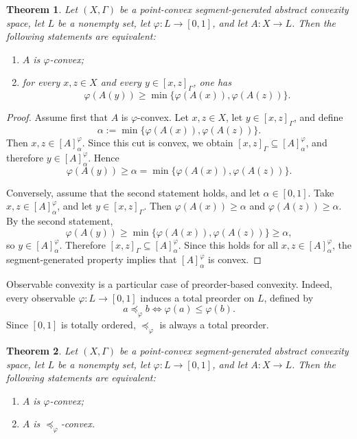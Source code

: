 \documentclass[11pt,a4paper]{article}
\newtheorem{theorem}{Theorem}
\begin{document}
\begin{theorem}\label{teo_obs_local}
Let \((X,\Gamma)\) be a point-convex segment-generated abstract convexity space, let \(L\) be a nonempty set, let \(\varphi:L\to[0,1]\), and let \(A:X\to L\). Then the following statements are equivalent:
\begin{enumerate}
    \item \(A\) is \(\varphi\)-convex;
    \item for every \(x,z\in X\) and every \(y\in[x,z]_{\Gamma}\), one has
    \[
    \varphi(A(y))\ge \min\{\varphi(A(x)),\varphi(A(z))\}.
    \]
\end{enumerate}
\end{theorem}

\begin{proof}
Assume first that \(A\) is \(\varphi\)-convex. Let \(x,z\in X\), let \(y\in[x,z]_{\Gamma}\), and define
\[
\alpha:=\min\{\varphi(A(x)),\varphi(A(z))\}.
\]
Then \(x,z\in[A]^\varphi_\alpha\). Since this cut is convex, we obtain \([x,z]_{\Gamma}\subseteq[A]^\varphi_\alpha\), and therefore \(y\in[A]^\varphi_\alpha\). Hence
\[
\varphi(A(y))\ge \alpha=\min\{\varphi(A(x)),\varphi(A(z))\}.
\]



Conversely, assume that the second statement holds, and let \(\alpha\in[0,1]\). Take \(x,z\in[A]^\varphi_\alpha\), and let \(y\in[x,z]_{\Gamma}\). Then \(\varphi(A(x))\ge\alpha\) and \(\varphi(A(z))\ge\alpha\). By the second statement,
\[
\varphi(A(y))\ge \min\{\varphi(A(x)),\varphi(A(z))\}\ge\alpha,
\]
so \(y\in[A]^\varphi_\alpha\). Therefore \([x,z]_{\Gamma}\subseteq[A]^\varphi_\alpha\). Since this holds for all \(x,z\in[A]^\varphi_\alpha\), the segment-generated property implies that \([A]^\varphi_\alpha\) is convex.
\end{proof}

Observable convexity is a particular case of preorder-based convexity. Indeed, every observable \(\varphi:L\to[0,1]\) induces a total preorder on \(L\), defined by
\[
a\preccurlyeq_{\varphi} b \Longleftrightarrow \varphi(a)\le \varphi(b).
\]
Since \([0,1]\) is totally ordered, \(\preccurlyeq_{\varphi}\) is always a total preorder.

\begin{theorem}\label{teo_observable_induced_order}
Let \((X,\Gamma)\) be a point-convex segment-generated abstract convexity space, let \(L\) be a nonempty set, let \(\varphi:L\to[0,1]\), and let \(A:X\to L\). Then the following statements are equivalent:
\begin{enumerate}
    \item \(A\) is \(\varphi\)-convex;
    \item \(A\) is \(\preccurlyeq_{\varphi}\)-convex.
\end{enumerate}
\end{theorem}
\end{document}
